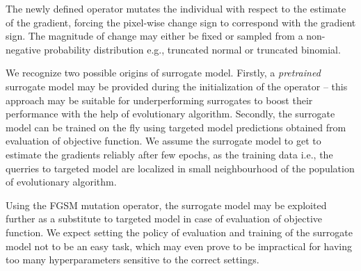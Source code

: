 The newly defined operator mutates the individual with respect to the estimate of the gradient, forcing the pixel-wise change sign to correspond with the gradient sign. The magnitude of change may either be fixed or sampled from a non-negative probability distribution e.g., truncated normal or truncated binomial.

We recognize two possible origins of surrogate model. Firstly, a \emph{pretrained} surrogate model may be provided during the initialization of the operator -- this approach may be suitable for underperforming surrogates to boost their performance with the help of evolutionary algorithm. Secondly, the surrogate model can be trained on the fly using targeted model predictions obtained from evaluation of objective function. We assume the surrogate model to get to estimate the gradients reliably after few epochs, as the training data i.e., the querries to targeted model are localized in small neighbourhood of the population of evolutionary algorithm.

Using the FGSM mutation operator, the surrogate model may be exploited further as a substitute to targeted model in case of evaluation of objective function. We expect setting the policy of evaluation and training of the surrogate model not to be an easy task, which may even prove to be impractical for having too many hyperparameters sensitive to the correct settings.
